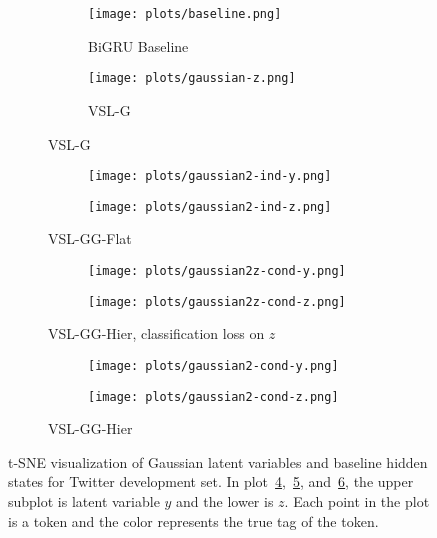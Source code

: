 \documentclass[11pt,a4paper]{article}
\newcommand{\vsmg}{VSL-G\xspace}
\newcommand{\vsmggflat}{VSL-GG-Flat\xspace}
\newcommand{\vsmgghier}{VSL-GG-Hier\xspace}
\begin{document}
\begin{figure}[t]
    \centering
    \begin{subfigure}{.25\textwidth}
        \begin{subfigure}{\textwidth}
        \centering
            \texttt{[image: plots/baseline.png]}
             \caption{BiGRU Baseline\label{fig:tsne-bigru}}
        \end{subfigure}
        \begin{subfigure}{\textwidth}
        \centering
        \texttt{[image: plots/gaussian-z.png]}
         \caption{\vsmg\label{fig:tsne-gauss}}
        \end{subfigure}
    \end{subfigure}\begin{subfigure}{.25\textwidth}
    \centering
        \begin{subfigure}{.9\textwidth}
        \texttt{[image: plots/gaussian2-ind-y.png]}
        \end{subfigure}
        \begin{subfigure}{.9\textwidth}
        \texttt{[image: plots/gaussian2-ind-z.png]}
        \end{subfigure}
     \caption{\vsmggflat \label{fig:tsne-2gind}}
    \end{subfigure}
    \begin{subfigure}{.25\textwidth}
    \centering
        \begin{subfigure}{.9\textwidth}
        \texttt{[image: plots/gaussian2z-cond-y.png]}
        \end{subfigure}
        \begin{subfigure}{.9\textwidth}
        \texttt{[image: plots/gaussian2z-cond-z.png]}
        \end{subfigure}
     \caption{\vsmgghier, classification loss on $z$  \label{fig:tsne-2gdepz}}
    \end{subfigure}\begin{subfigure}{.25\textwidth}
    \centering
        \begin{subfigure}{.9\textwidth}
        \texttt{[image: plots/gaussian2-cond-y.png]}
        \end{subfigure}
        \begin{subfigure}{.9\textwidth}
        \texttt{[image: plots/gaussian2-cond-z.png]}
        \end{subfigure}
     \caption{\vsmgghier \label{fig:tsne-2gdep}}
    \end{subfigure}
\caption{t-SNE visualization of Gaussian latent variables and baseline hidden states for Twitter development set. In plot~\ref{fig:tsne-2gind},~\ref{fig:tsne-2gdepz},  and~\ref{fig:tsne-2gdep}, the upper subplot is latent variable $y$ and the lower is $z$. Each point in the plot is a token and the color represents the true tag of the token.}
\label{fig:gauss_lv}
\end{figure}
\end{document}
